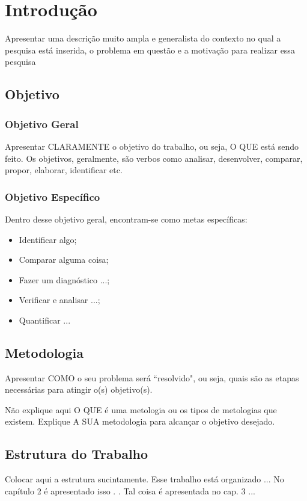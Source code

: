 \chapter{Introdução}

Apresentar uma descrição muito ampla e generalista do contexto no qual a pesquisa está inserida, o problema em questão e a motivação para realizar essa pesquisa

\lipsum[1]

\section{Objetivo}
\subsection{Objetivo Geral}

Apresentar CLARAMENTE o objetivo do trabalho, ou seja, O QUE está sendo feito. Os objetivos, geralmente, são verbos como analisar, desenvolver, comparar, propor, elaborar, identificar etc.

\subsection{Objetivo Específico}

Dentro desse objetivo geral, encontram-se como metas específicas:
\begin{itemize}
    \item Identificar algo; 
  
    \item Comparar alguma coisa;
   
   \item Fazer um diagnóstico ...;
   
   \item Verificar e analisar ...;
   
    \item Quantificar ...
\end{itemize}

\section{Metodologia}

Apresentar COMO o seu problema será ``resolvido", ou seja, quais são as etapas necessárias para atingir o(s) objetivo(s).

Não explique aqui O QUE é uma metologia ou os tipos de metologias que existem. 
Explique A SUA metodologia para alcançar o objetivo desejado.



\section{Estrutura do Trabalho}

Colocar aqui a estrutura sucintamente. Esse trabalho está organizado ... No capítulo 2 é apresentado isso . . Tal coisa é apresentada no cap. 3 ...

